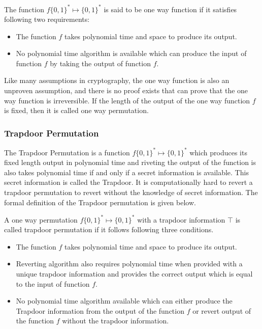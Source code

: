 \begin{definition} The function $f\{0, 1\}^* \mapsto  \{0, 1\}^*$ is said to be one way function if it satisfies following two requirements:
\begin{itemize}
\item The function $f$ takes polynomial time and space to produce its output.
\item No polynomial time algorithm is available which can produce the input of function $f$ by taking the output of function $f$.
\end{itemize}
\end{definition}

Like many assumptions in cryptography, the one way function is also an unproven assumption, and there is no proof exists that can prove that the one way function is irreversible. If the length of the output of the one way function $f$ is fixed, then it is called one way permutation.

\subsubsection{Trapdoor Permutation}
The Trapdoor Permutation is a function $f\{0, 1\}^* \mapsto  \{0, 1\}^*$ which produces its fixed length output in polynomial time and riveting the output of the function is also takes polynomial time if and only if a secret information is available. This secret information is called the Trapdoor. It is computationally hard to revert a trapdoor permutation to revert without the knowledge of secret information. The formal definition of the Trapdoor permutation is given below.

\begin{definition} A one way permutation $f\{0, 1\}^* \mapsto  \{0, 1\}^*$ with a trapdoor information $\intercal$  is called trapdoor permutation if it follows following three conditions.
\begin{itemize}
\item The function $f$ takes polynomial time and space to produce its output.
\item Reverting algorithm also requires polynomial time when provided with a unique trapdoor information and provides the correct output which is equal to the input of function $f$.
\item No polynomial time algorithm available which can either produce the Trapdoor information from the output of the function $f$ or revert output of the function $f$ without the trapdoor information.
\end{itemize}
\end{definition}

